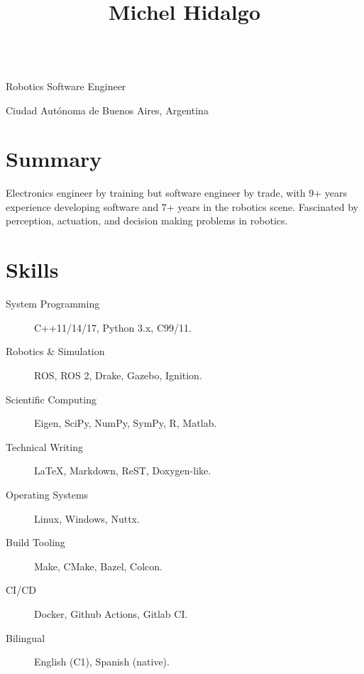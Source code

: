 \documentclass[english, letterpaper]{resume}
\begin{document}
\begin{center}
  \title{Michel Hidalgo} \\
  Robotics Software Engineer \\
  \address{Buenos Aires}{
    Ciudad Autónoma de Buenos Aires,
    Argentina} \\
  \begin{inlined}
    \item {}
    \item {}
    \item {}
  \end{inlined}
\end{center}

\section*{Summary}

Electronics engineer by training but software engineer by trade, with 9+ years experience developing software and 7+ years in the robotics scene. Fascinated by perception, actuation, and decision making problems in robotics.

\section*{Skills}

\hfill
\begin{minipage}{0.55\linewidth}
  \begin{description}
    \item[System Programming] C++11/14/17, Python 3.x, C99/11.
    \item[Robotics \& Simulation] ROS, ROS 2, Drake, Gazebo, Ignition.
    \item[Scientific Computing] Eigen, SciPy, NumPy, SymPy, R, Matlab.
    \item[Technical Writing] La\TeX, Markdown, ReST, Doxygen-like.
  \end{description}
\end{minipage}\hfill
\begin{minipage}{0.4\linewidth}
  \begin{description}
    \item[Operating Systems] Linux, Windows, Nuttx.
    \item[Build Tooling] Make, CMake, Bazel, Colcon.
    \item[CI/CD] Docker, Github Actions, Gitlab CI.
    \item[Bilingual] English (C1), Spanish (native).
  \end{description}
\end{minipage}
\hfill
\end{document}
